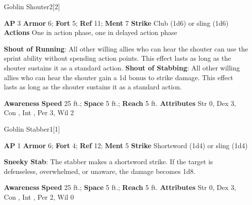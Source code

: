 \begin{monsection}{Goblin Shouter}{2}[2]
\vspace{-1em}\vspace{-1em}
\begin{spellcontent}
\begin{spelltargetinginfo}
{\textbf{AP} 3}
\pari \textbf{Armor} 6;
\textbf{Fort} 5;
\textbf{Ref} 11;
\textbf{Ment} 7
\pari \textbf{Strike} Club  (1d6) or sling  (1d6)
\pari \textbf{Actions} One in action phase, one in delayed action phase
\end{spelltargetinginfo}
\begin{spelleffects}
\pari
\textbf{Shout of Running}:
All other willing allies who can hear the shouter can use the sprint ability without spending action points.
This effect lasts as long as the shouter sustains it as a standard action.
\vspace{0.5em}
\pari
\textbf{Shout of Stabbing}:
All other willing allies who can hear the shouter gain a \plus1d bonus to strike damage.
This effect lasts as long as the shouter sustains it as a standard action.
\end{spelleffects}
\end{spellcontent}
\begin{spellsubcontent}
\begin{spellfooter}
\pari \textbf{Awareness} 
\pari \textbf{Speed} 25 ft.;
\textbf{Space} 5 ft.;
\textbf{Reach} 5 ft.
\pari \textbf{Attributes}
Str 0,
Dex 3,
Con ,
Int ,
Per 3,
Wil 2
\end{spellfooter}
\end{spellsubcontent}
\end{monsection}
\begin{monsection}{Goblin Stabber}{1}[1]
\vspace{-1em}\vspace{-1em}
\begin{spellcontent}
\begin{spelltargetinginfo}
{\textbf{AP} 1}
\pari \textbf{Armor} 6;
\textbf{Fort} 4;
\textbf{Ref} 12;
\textbf{Ment} 5
\pari \textbf{Strike} Shortsword  (1d4) or sling  (1d4)
\end{spelltargetinginfo}
\begin{spelleffects}
\pari
\textbf{Sneeky Stab}:
The stabber makes a shortsword strike.
If the target is defenseless, overwhelmed, or unaware, the damage becomes 1d8.
\end{spelleffects}
\end{spellcontent}
\begin{spellsubcontent}
\begin{spellfooter}
\pari \textbf{Awareness} 
\pari \textbf{Speed} 25 ft.;
\textbf{Space} 5 ft.;
\textbf{Reach} 5 ft.
\pari \textbf{Attributes}
Str 0,
Dex 3,
Con ,
Int ,
Per 2,
Wil 0
\end{spellfooter}
\end{spellsubcontent}
\end{monsection}
